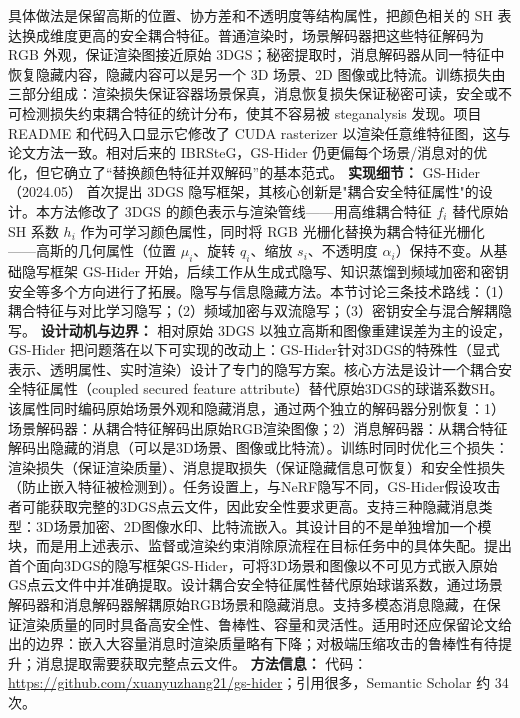 具体做法是保留高斯的位置、协方差和不透明度等结构属性，把颜色相关的 SH 表达换成维度更高的安全耦合特征。普通渲染时，场景解码器把这些特征解码为 RGB 外观，保证渲染图接近原始 3DGS；秘密提取时，消息解码器从同一特征中恢复隐藏内容，隐藏内容可以是另一个 3D 场景、2D 图像或比特流。训练损失由三部分组成：渲染损失保证容器场景保真，消息恢复损失保证秘密可读，安全或不可检测损失约束耦合特征的统计分布，使其不容易被 steganalysis 发现。项目 README 和代码入口显示它修改了 CUDA rasterizer 以渲染任意维特征图，这与论文方法一致。相对后来的 IBRSteG，GS-Hider 仍更偏每个场景/消息对的优化，但它确立了“替换颜色特征并双解码”的基本范式。
\textbf{实现细节：} GS-Hider（2024.05） 首次提出 3DGS 隐写框架，其核心创新是"耦合安全特征属性"的设计。本方法修改了 3DGS 的颜色表示与渲染管线——用高维耦合特征 $f_i$ 替代原始 SH 系数 $h_i$ 作为可学习颜色属性，同时将 RGB 光栅化替换为耦合特征光栅化——高斯的几何属性（位置 $\mu_i$、旋转 $q_i$、缩放 $s_i$、不透明度 $\alpha_i$）保持不变。从基础隐写框架 GS-Hider 开始，后续工作从生成式隐写、知识蒸馏到频域加密和密钥安全等多个方向进行了拓展。隐写与信息隐藏方法。本节讨论三条技术路线：（1）耦合特征与对比学习隐写；（2）频域加密与双流隐写；（3）密钥安全与混合解耦隐写。
\textbf{设计动机与边界：} 相对原始 3DGS 以独立高斯和图像重建误差为主的设定，GS-Hider 把问题落在以下可实现的改动上：GS-Hider针对3DGS的特殊性（显式表示、透明属性、实时渲染）设计了专门的隐写方案。核心方法是设计一个耦合安全特征属性（coupled secured feature attribute）替代原始3DGS的球谐系数SH。该属性同时编码原始场景外观和隐藏消息，通过两个独立的解码器分别恢复：1）场景解码器：从耦合特征解码出原始RGB渲染图像；2）消息解码器：从耦合特征解码出隐藏的消息（可以是3D场景、图像或比特流）。训练时同时优化三个损失：渲染损失（保证渲染质量）、消息提取损失（保证隐藏信息可恢复）和安全性损失（防止嵌入特征被检测到）。任务设置上，与NeRF隐写不同，GS-Hider假设攻击者可能获取完整的3DGS点云文件，因此安全性要求更高。支持三种隐藏消息类型：3D场景加密、2D图像水印、比特流嵌入。其设计目的不是单独增加一个模块，而是用上述表示、监督或渲染约束消除原流程在目标任务中的具体失配。提出首个面向3DGS的隐写框架GS-Hider，可将3D场景和图像以不可见方式嵌入原始GS点云文件中并准确提取。设计耦合安全特征属性替代原始球谐系数，通过场景解码器和消息解码器解耦原始RGB场景和隐藏消息。支持多模态消息隐藏，在保证渲染质量的同时具备高安全性、鲁棒性、容量和灵活性。适用时还应保留论文给出的边界：嵌入大容量消息时渲染质量略有下降；对极端压缩攻击的鲁棒性有待提升；消息提取需要获取完整点云文件。
\textbf{方法信息：} 代码：\url{https://github.com/xuanyuzhang21/gs-hider}；引用很多，Semantic Scholar 约 34 次。




